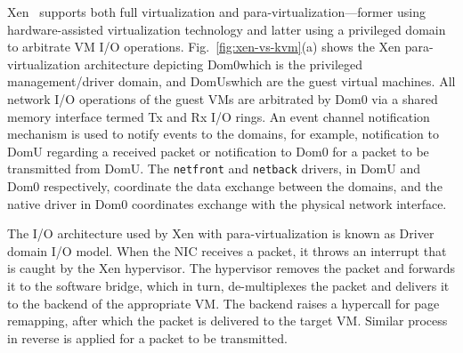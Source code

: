 Xen~\cite{xen-art-of-virtualization} supports both full virtualization and 
para-virtualization---former using hardware-assisted virtualization technology
and latter using a privileged domain to arbitrate VM I/O operations.
Fig.~\ref{fig:xen-vs-kvm}(a) shows the Xen 
para-virtualization architecture depicting 
Dom0\textemdash{}which 
is the privileged management/driver domain, and 
DomUs\textemdash{}which 
are the guest virtual machines. 
All network I/O operations
of the guest VMs are arbitrated by Dom0 via a shared memory interface
termed Tx and Rx I/O rings. 
An event channel notification mechanism is used to notify events
to the domains, for example, notification to DomU regarding a 
received packet or notification to Dom0 for a packet to be
transmitted from DomU.
The \texttt{netfront} 
and \texttt{netback} 
drivers, in DomU and Dom0 respectively,
coordinate the data exchange between the domains,
and the native driver in Dom0 coordinates exchange with
the physical network interface. 

The I/O architecture used by Xen with para-virtualization 
is known as Driver domain I/O model. 
When the NIC receives a packet, it throws an interrupt that is caught by
the Xen hypervisor. The hypervisor removes the packet and forwards it
to the software bridge, which in turn, de-multiplexes the packet 
and delivers it to the backend of the appropriate VM. The backend
raises a hypercall for page remapping, after which the packet is 
delivered to the target VM. Similar process in reverse is applied
for a packet to be transmitted.

